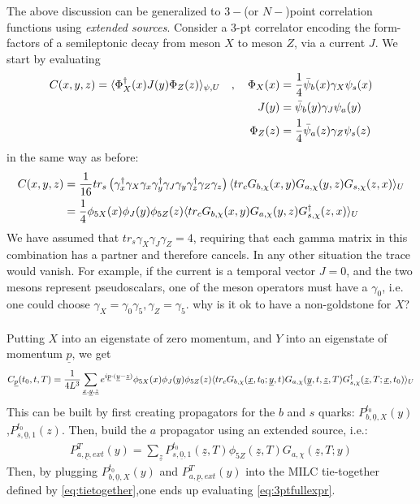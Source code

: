 The above discussion can be generalized to $3-$(or $N-$)point correlation functions using {\it{extended sources}}. Consider a 3-pt correlator encoding the form-factors of a semileptonic decay from meson $X$ to meson $Z$, via a current $J$. We start by evaluating
\begin{align}
	C(x,y,z) = \langle \Phi^{\dagger}_X(x) J(y) \Phi_Z(z) \rangle_{\psi,U} \quad , \quad \Phi_X(x) &= {1\over 4} \bar{\psi}_b(x) \gamma_X \psi_s(x) \\
	\nonumber
	J(y) &= \bar{\psi}_b(y)\gamma_J\psi_a(y) \\
	\nonumber
	\Phi_Z(z) &= {1\over 4}\bar{\psi}_a(z)\gamma_Z \psi_s(z)
\end{align}
in the same way as before:
\begin{align}
	C(x,y,z) &= {1\over 16} tr_s\left( \gamma^{\dagger}_x \gamma_X \gamma_x \gamma^{\dagger}_y \gamma_J \gamma_y \gamma^{\dagger}_z \gamma_Z \gamma_z \right) \langle tr_c G_{b,\chi}(x,y) G_{a,\chi}(y,z) G_{s,\chi}(z,x)\rangle_U \\
	&= {1\over 4} \phi_{5X}(x) \phi_J(y) \phi_{5Z}(z) \langle tr_c G_{b,\chi}(x,y) G_{a,\chi}(y,z) G^{\dagger}_{s,\chi}(z,x) \rangle_U
\end{align}
We have assumed that $tr_s \gamma_X\gamma_J\gamma_Z = 4$, requiring that each gamma matrix in this combination has a partner and therefore cancels. In any other situation the trace would vanish. For example, if the current is a temporal vector $J=0$, and the two mesons represent pseudoscalars, one of the meson operators must have a $\gamma_0$, i.e. one could choose $\gamma_X=\gamma_0\gamma_5, \gamma_Z=\gamma_5$. {\color{red}why is it ok to have a non-goldstone for $X$?}
\\ \\
Putting $X$ into an eigenstate of zero momentum, and $Y$ into an eigenstate of momentum $\underline{p}$, we get
\begin{align}
	C_{\underline{p}}(t_0,t,T) = {1\over 4 L^3} \sum_{\underline{x},\underline{y},\underline{z}} e^{i\underline{p}\cdot(\underline{y}-\underline{z})} \phi_{5X}(x) \phi_J(y) \phi_{5Z}(z) \langle tr_c G_{b,\chi}(\underline{x},t_0;\underline{y},t) G_{a,\chi}(\underline{y},t,\underline{z},T) G^{\dagger}_{s,\chi}(\underline{z},T;\underline{x},t_0) \rangle_U
	\label{eq:3ptfullexpr}
\end{align}
This can be built by first creating propagators for the $b$ and $s$ quarks: $P^{t_0}_{b,\underline{0},X}(y)$,$P^{t_0}_{s,\underline{0},1}(z)$. Then, build the $a$ propagator using an extended source, i.e.:
\begin{align}
	P^T_{a,\underline{p},ext}(y) = \sum_{\underline{z}} P^{t_0}_{s,\underline{0},1}(\underline{z},T) \phi_{5Z}(\underline{z},T) G_{a,\chi}(\underline{z},T;y)
\end{align}
Then, by plugging $P^{t_0}_{b,\underline{0},X}(y)$ and $P^T_{a,\underline{p},ext}(y)$ into the MILC tie-together defined by \eqref{eq:tietogether},one ends up evaluating \eqref{eq:3ptfullexpr}.

